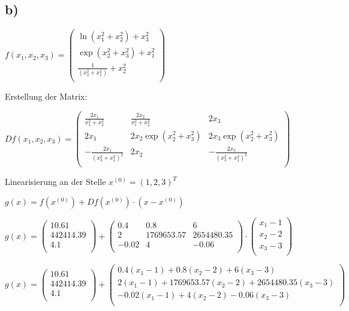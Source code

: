 \documentclass{article}
\begin{document}
\subsection*{b)}

\(f(x_1,x_2,x_3) = 
\begin{pmatrix}
\ln(x_1^2+x_2^2)+x_3^2\\
\exp(x_2^2+x_3^2)+x_1^2\\
\frac{1}{(x_3^2+x_1^2)}+x_2^2\\
\end{pmatrix}
\)

Erstellung der Matrix:

\(
Df(x_1,x_2,x_3) =
\begin{pmatrix}
\frac{2x_1}{x_1^2+x_2^2} & \frac{2x_2}{x_1^2+x_2^2} & 2x_3\\
2x_1 & 2x_2\exp(x_2^2+x_3^2) & 2x_3\exp(x_2^2+x_3^2)\\
-\frac{2x_1}{(x_3^2+x_1^2)^2} & 2x_2 & -\frac{2x_3}{(x_3^2+x_1^2)^2}\\
\end{pmatrix}
\)

Linearisierung an der Stelle \(x^{(0)} = (1,2,3)^T\)

\(g(x) = f(x^{(0)}) + Df(x^{(0)}) \cdot (x-x^{(0)})\)

\(
g(x) =
\begin{pmatrix}
10.61\\
442414.39\\
4.1\\
\end{pmatrix}
+
\begin{pmatrix}
0.4 & 0.8 & 6\\
2 & 1769653.57 & 2654480.35\\
-0.02 & 4 & -0.06\\
\end{pmatrix}
\cdot
\begin{pmatrix}
x_1 - 1\\
x_2 - 2\\
x_3 - 3\\
\end{pmatrix}
\)

\(
g(x) =
\begin{pmatrix}
10.61\\
442414.39\\
4.1\\
\end{pmatrix}
+
\begin{pmatrix}
0.4(x_1-1)+0.8(x_2 - 2)+6(x_3-3)\\
2(x_1-1)+1769653.57(x_2-2)+2654480.35(x_3-3)\\
-0.02(x_1-1)+4(x_2-2)-0.06(x_3-3)\\
\end{pmatrix}
\)
\end{document}
